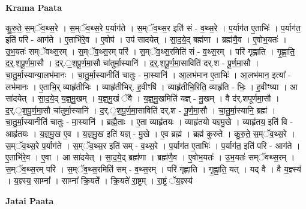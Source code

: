 \documentclass[17pt]{extarticle}
\begin{document}
\textbf{Krama Paata} \newline

कु॒रु॒ते॒ स॒म्ॅव॒थ्स॒रे । स॒म्ॅव॒थ्स॒रे प॒र्याग॑ते । स॒म्ॅव॒थ्स॒र इति॑ सं - व॒थ्स॒रे । प॒र्याग॑त ए॒ताभिः॑ । प॒र्याग॑त॒ इति॑ परि - आग॑ते । ए॒ताभि॑रे॒व । ए॒वोप॑ । उप॑ सादयेत् । सा॒द॒ये॒द् बह्म॑णा । ब्रह्म॑णै॒व । ए॒वोभ॒यतः॑ । उ॒भ॒यतः॑ सम्ॅवथ्स॒रम् । स॒म्ॅव॒थ्स॒रम् परि॑ । स॒म्ॅव॒थ्स॒रमिति॑ सं - व॒थ्स॒रम् । परि॑ गृह्णाति । गृ॒ह्णा॒ति॒ द॒र्॒.श॒पू॒र्ण॒मा॒सौ । द॒र्.॒श॒पू॒र्ण॒मा॒सौ चा॑तुर्मा॒स्यानि॑ । द॒र्॒.श॒पू॒र्ण॒मा॒साविति॑ दर्.श - पू॒र्ण॒मा॒सौ । चा॒तु॒र्मा॒स्यान्या॒लभ॑मानः । चा॒तु॒र्मा॒स्यानीति॑ चातुः - मा॒स्यानि॑ । आ॒लभ॑मान ए॒ताभिः॑ । आ॒लभ॑मान॒ इत्या᳚ - लभ॑मानः । ए॒ताभि॒र् व्याहृ॑तीभिः । व्याहृ॑तीभिर्. ह॒वीꣳषि॑ । व्याहृ॑तीभि॒रिति॒ व्याहृ॑ति - भिः॒ । ह॒वीꣳष्या । 
आ सा॑दयेत् । सा॒द॒ये॒द् य॒ज्ञ्॒मु॒खम् । य॒ज्ञ्॒मु॒खं ॅवै । य॒ज्ञ्॒मु॒खमिति॑ यज्ञ् - मु॒खम् । वै द॑र्.शपूर्णमा॒सौ । द॒र्.॒श॒पू॒र्ण॒मा॒सौ चा॑तुर्मा॒स्यानि॑ । द॒र्.॒श॒पू॒र्ण॒मा॒साविति॑ दर्.श - पू॒र्ण॒मा॒सौ । चा॒तु॒र्मा॒स्यानि॒ ब्रह्म॑ । चा॒तु॒र्मा॒स्यानीति॑ चातुः - मा॒स्यानि॑ । ब्रह्मै॒ताः । ए॒ता व्याहृ॑तयः । व्याहृ॑तयो यज्ञ्मु॒खे । व्याहृ॑तय॒ इति॑ वि - आहृ॑तयः । य॒ज्ञ्॒मु॒ख ए॒व । य॒ज्ञ्॒मु॒ख इति॑ यज्ञ् - मु॒खे । ए॒व ब्रह्म॑ । ब्रह्म॑ कुरुते । कु॒रु॒ते॒ स॒म्ॅव॒थ्स॒रे । स॒म्ॅव॒थ्स॒रे प॒र्याग॑ते । स॒म्ॅव॒थ्स॒र इति॑ सम् - व॒थ्स॒रे । प॒र्याग॑त ए॒ताभिः॑ । प॒र्याग॑त॒ इति॑ परि - आग॑ते । ए॒ताभि॑रे॒व । ए॒वा । आ सा॑दयेत् । सा॒द॒ये॒द् ब्रह्म॑णा । ब्रह्म॑णै॒व । ए॒वोभ॒यतः॑ । उ॒भ॒यतः॑ सम्ॅवथ्स॒रम् । स॒म्ॅव॒थ्स॒रम् परि॑ । स॒म्ॅव॒थ्स॒रमिति॑ सम् - व॒थ्स॒रम् । परि॑ गृह्णाति । गृ॒ह्णा॒ति॒ यत् । यद् वै । वै य॒ज्ञ्स्य॑ । य॒ज्ञ्स्य॒ साम्ना᳚ । साम्ना᳚ क्रि॒यते᳚ । क्रि॒यते॑ रा॒ष्ट्रम् । रा॒ष्ट्रं ॅय॒ज्ञ्स्य॑ \newline

\textbf{Jatai Paata} \newline
\end{document}

